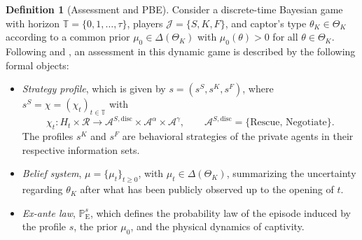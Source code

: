 \documentclass[review,authoryear,12pt]{elsarticle}
\providecommand{\textcite}{\citet}
\theoremstyle{plain}
\theoremstyle{definition}
\newtheorem{definition}[theorem]{Definition}
\newcommand{\ProbE}{\mathbb{P}_{\mathrm{E}}}
\newcommand{\ThetaK}{\Theta_K}
\newcommand{\1}{\mathbf{1}}
\begin{document}
\begin{definition}[Assessment and PBE]
\label{def:pbe-mechanism}
Consider a discrete-time Bayesian game with horizon $\mathbb{T}=\{0,1,\ldots,\tau\}$, players $\mathcal{J}=\{S,K,F\}$, and captor's type $\theta_K\in\ThetaK$ according to a common prior $\mu_0\in\Delta(\ThetaK)$ with $\mu_0(\theta)>0$ for all $\theta\in\ThetaK$. Following \textcite{FudenbergTirole1991} and \textcite{KrepsWilson1982}, an assessment in this dynamic game is described by the following formal objects:

\begin{itemize}
  \item \emph{Strategy profile}, which is given by $s=(s^S,s^K,s^F)$, where $s^S=\chi=(\chi_t)_{t\in\mathbb{T}}$ with
  \[
    \chi_t \colon H_t\times\mathcal{R}
    \longrightarrow \mathcal{A}^{S,\mathrm{disc}}\times\mathcal{A}^{\alpha}\times\mathcal{A}^{\gamma},
    \qquad
    \mathcal{A}^{S,\mathrm{disc}}=\{\text{Rescue},\,\text{Negotiate}\}.
  \]
  The profiles $s^K$ and $s^F$ are behavioral strategies of the private agents in their respective information sets.
  \item \emph{Belief system}, $\mu=\{\mu_t\}_{t\ge 0}$, with $\mu_t\in\Delta(\ThetaK)$, summarizing the uncertainty regarding $\theta_K$ after what has been publicly observed up to the opening of $t$.
  \item \emph{Ex-ante law}, $\ProbE^s$, which defines the probability law of the episode induced by the profile $s$, the prior $\mu_0$, and the physical dynamics of captivity.
\end{itemize}


\end{definition}
\end{document}
